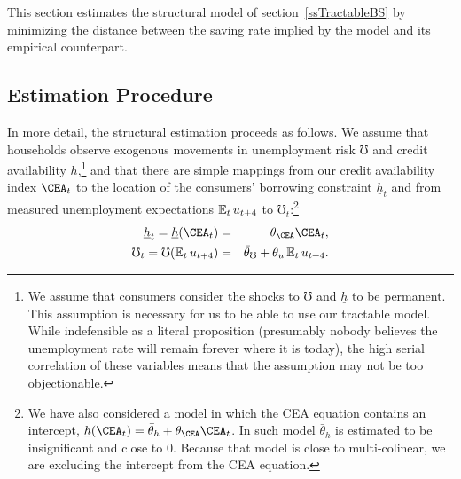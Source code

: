 \documentclass[titlepage]{\econtex}
\begin{document}
This section estimates the structural model of section~\ref{ssTractableBS} by minimizing the distance between the saving rate implied by the model and its empirical counterpart. %

\hypertarget{Estimation-Procedure}{}
\subsection{Estimation Procedure}

In more detail, the structural estimation proceeds as follows. We assume that households observe exogenous movements in unemployment risk $\mho$ and credit availability $\underline{h}$,\footnote{We assume that consumers consider the shocks to $\mho$ and $\underline{h}$ to be permanent.  This assumption is necessary for us to be able to use our tractable model.  While indefensible as a literal proposition (presumably nobody believes the unemployment rate will remain forever where it is today), the high serial correlation of these variables means that the assumption may not be too objectionable.} and that there are simple mappings from our credit availability index $\CEA_{t}$ to the location of the consumers' borrowing constraint $\underline{h}_{t}$ and from measured unemployment expectations $\operatorname{\mathbb{E}}_{t}u_{t+4}$ to $\mho_{t}$:\footnote{We have also considered a model in which the CEA equation contains an intercept, $\underline{h}(\CEA_{t}) = \bar{\theta}_h+\theta_\CEA \CEA_{t}$. In such model $\bar{\theta}_h$ is estimated to be insignificant and close to 0.  Because that model is close to multi-colinear, we are excluding the intercept from the CEA equation. }
\begin{eqnarray}
 \underline{h}_{t} = \underline{h}(\CEA_{t}) & = & \theta_\CEA \CEA_{t}, \nonumber \\
\mho_{t}= \mho(\Ex_{t}u_{t+4}) & = & \bar{\theta}_\mho+\theta_u \Ex_{t}u_{t+4}. \label{unempEq}
\end{eqnarray}
\end{document}
